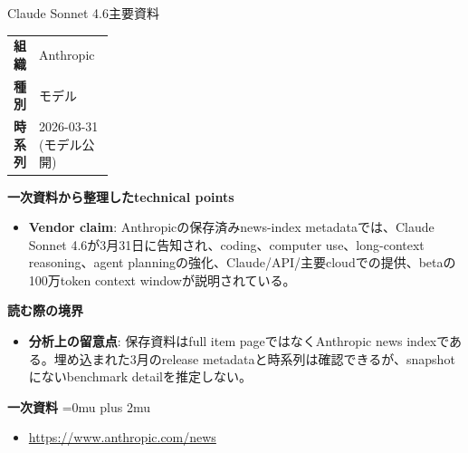 \begin{technicalnote}{Claude Sonnet 4.6}{主要資料}
\begingroup
\begin{tabularx}{\linewidth}{@{}>{\bfseries}p{0.22\linewidth}X@{}}
組織 & Anthropic \\
種別 & モデル \\
時系列 & 2026-03-31 (モデル公開) \\
\end{tabularx}
\smallskip
{\bfseries 一次資料から整理したtechnical points}
\begin{itemize}[leftmargin=1.5em,itemsep=0.35em]
\item \textbf{Vendor claim}: Anthropicの保存済みnews-index metadataでは、Claude Sonnet 4.6が3月31日に告知され、coding、computer use、long-context reasoning、agent planningの強化、Claude/API/主要cloudでの提供、betaの100万token context windowが説明されている。
\end{itemize}
\begin{minipage}{\linewidth}
{\bfseries 読む際の境界}
\begin{itemize}[leftmargin=1.5em,itemsep=0.35em]
\item \textbf{分析上の留意点}: 保存資料はfull item pageではなくAnthropic news indexである。埋め込まれた3月のrelease metadataと時系列は確認できるが、snapshotにないbenchmark detailを推定しない。
\end{itemize}
\begin{samepage}
{\bfseries 一次資料}
\begingroup\sloppy
\Urlmuskip=0mu plus 2mu\relax
\begin{itemize}[leftmargin=1.5em,itemsep=0.25em]
\item {\scriptsize\url{https://www.anthropic.com/news}}
\end{itemize}
\endgroup
\end{samepage}
\end{minipage}
\endgroup
\end{technicalnote}
\medskip


